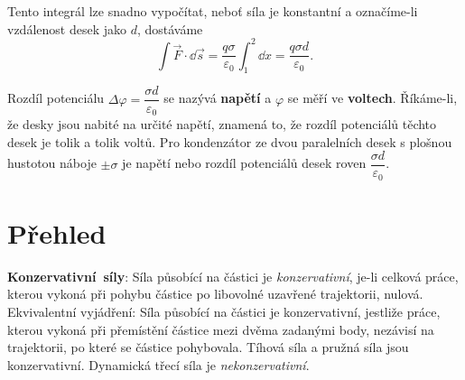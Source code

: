     Tento integrál lze snadno vypočítat, neboť síla je konstantní a označíme-li vzdálenost desek 
    jako \(d\), dostáváme
    \begin{equation}\label{FYZ:eq014}
      \int\vec{F}\cdot\dd{\vec{s}} = \frac{q\sigma}{\varepsilon_0}\int_1^2\dd{x} 
                                   = \frac{q\sigma d}{\varepsilon_0}.
    \end{equation}
    
    Rozdíl potenciálu \(\Delta\varphi = \dfrac{\sigma d}{\varepsilon_0}\) se nazývá \textbf{napětí} 
    a \(\varphi\) se měří ve \textbf{voltech}. Říkáme-li, že desky jsou nabité na určité napětí, 
    znamená to, že rozdíl potenciálů těchto desek je tolik a tolik voltů. Pro kondenzátor ze dvou 
    paralelních desek s plošnou hustotou náboje \(\pm\sigma\) je napětí nebo rozdíl potenciálů 
    desek roven \(\dfrac{\sigma d}{\varepsilon_0}\).
    
  \section{Přehled}
    \mbox{\textbf{Konzervativní síly}}: Síla působící na částici je \emph{konzervativní}, je-li 
    celková práce, kterou vykoná při pohybu částice po libovolné uzavřené trajektorii, nulová. 
    Ekvivalentní vyjádření: Síla působící na částici je konzervativní, jestliže práce, kterou 
    vykoná při přemístění částice mezi dvěma zadanými body, nezávisí na trajektorii, po které se
    částice pohybovala. Tíhová síla a pružná síla jsou konzervativní. Dynamická třecí síla je 
    \emph{nekonzervativní}.
    
\printbibliography[heading=subbibliography]
